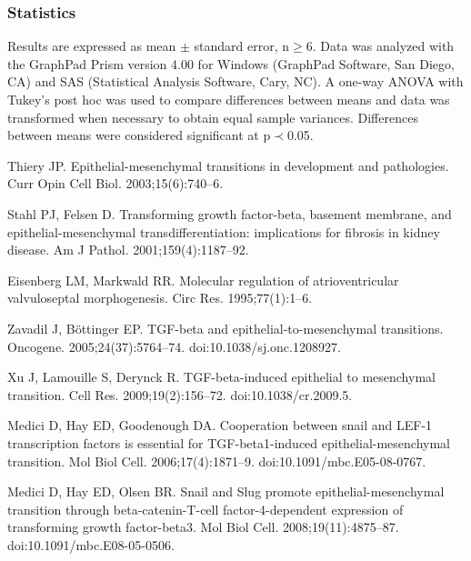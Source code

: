\documentclass[11pt,letterpaper]{article}
\begin{document}
\subsubsection*{Statistics}
Results are expressed as mean $\pm$ standard error, n$\geq$6. Data was analyzed with the GraphPad Prism version 4.00 for Windows (GraphPad Software, San Diego, CA) and SAS (Statistical Analysis Software, Cary, NC). A one-way ANOVA with Tukey's post hoc was used to compare differences between means and data was transformed when necessary to obtain equal sample variances. Differences between means were considered significant at p$\prec$0.05.

\clearpage

%
\begin{thebibliography}{10}

Thiery JP.
\newblock Epithelial-mesenchymal transitions in development and pathologies.
\newblock Curr Opin Cell Biol. 2003;15(6):740--6.

Stahl PJ, Felsen D.
\newblock Transforming growth factor-beta, basement membrane, and
  epithelial-mesenchymal transdifferentiation: implications for fibrosis in
  kidney disease.
\newblock Am J Pathol. 2001;159(4):1187--92.

Eisenberg LM, Markwald RR.
\newblock Molecular regulation of atrioventricular valvuloseptal morphogenesis.
\newblock Circ Res. 1995;77(1):1--6.

Zavadil J, B{\"o}ttinger EP.
\newblock TGF-beta and epithelial-to-mesenchymal transitions.
\newblock Oncogene. 2005;24(37):5764--74.
\newblock doi:{10.1038/sj.onc.1208927}.

Xu J, Lamouille S, Derynck R.
\newblock TGF-beta-induced epithelial to mesenchymal transition.
\newblock Cell Res. 2009;19(2):156--72.
\newblock doi:{10.1038/cr.2009.5}.

Medici D, Hay ED, Goodenough DA.
\newblock Cooperation between snail and LEF-1 transcription factors is
  essential for TGF-beta1-induced epithelial-mesenchymal transition.
\newblock Mol Biol Cell. 2006;17(4):1871--9.
\newblock doi:{10.1091/mbc.E05-08-0767}.

Medici D, Hay ED, Olsen BR.
\newblock Snail and Slug promote epithelial-mesenchymal transition through
  beta-catenin-T-cell factor-4-dependent expression of transforming growth
  factor-beta3.
\newblock Mol Biol Cell. 2008;19(11):4875--87.
\newblock doi:{10.1091/mbc.E08-05-0506}.


\end{thebibliography}
\end{document}

